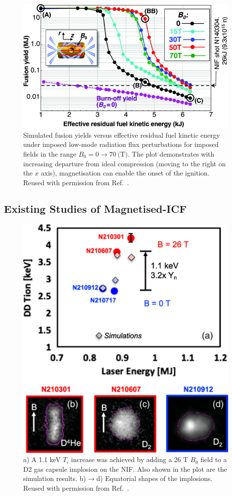 \begin{figure}[t!]
    \includegraphics[width=0.75\linewidth]{Results2/Images/magicf_perkins.jpeg}
    \centering
    \caption{Simulated fusion yields versus effective residual fuel kinetic energy under imposed low-mode radiation flux perturbations for imposed fields in the range $B_0=0\rightarrow70\ \text{(T)}$.
    The plot demonstrates with increasing departure from ideal compression (moving to the right on the $x$ axis), magnetisation can enable the onset of the ignition.
    Reused with permission from Ref.~\cite{perkins_potential_2017}.}%
    \label{fig:Res2_perkins_magicf}
\end{figure}


\subsection{Existing Studies of Magnetised-ICF}%
\label{sec:Res2_magicf_prevwork}


\begin{figure}[t!]
    \includegraphics[width=0.5\linewidth]{Results2/Images/magnif_yield_inc.png}
    \centering
    \caption{a) A 1.1 keV $T_i$ increase was achieved by adding a 26 T $B_0$ field to a D2 gas capsule implosion on the \ac{NIF}.
    Also shown in the plot are the simulation results.
    b)$\rightarrow$d) Equatorial shapes of the implosions.
    Reused with permission from Ref.~\cite{moody_increased_2022}.}%
    \label{fig:Res2_moody_magnif}
\end{figure}


